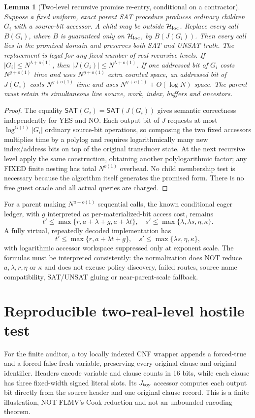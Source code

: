\documentclass[11pt]{article}
\newtheorem{lemma}[theorem]{Lemma}
\newcommand{\SAT}{\mathsf{SAT}}
\begin{document}
\begin{lemma}[Two-level recursive promise re-entry, conditional on a contractor]\label{lem:reentry}
Suppose a fixed uniform, exact parent SAT procedure produces ordinary children $G_i$ with a source-bit accessor. A child may be outside $\mathcal H_{\rm loc}$. Replace every call $B(G_i)$, where $B$ is guaranteed only on $\mathcal H_{\rm loc}$, by $B(J(G_i))$. Then every call lies in the promised domain and preserves both SAT and UNSAT truth. The replacement is legal for any fixed number of real recursive levels. If $|G_i|\le N^{\lambda+o(1)}$, then $|J(G_i)|\le N^{\lambda+o(1)}$. If one addressed bit of $G_i$ costs $N^{g+o(1)}$ time and uses $N^{\eta+o(1)}$ extra counted space, an addressed bit of $J(G_i)$ costs $N^{g+o(1)}$ time and uses $N^{\eta+o(1)}+O(\log N)$ space. The parent must retain its simultaneous live source, work, index, buffers and ancestors.
\end{lemma}
\begin{proof}
The equality $\SAT(G_i)=\SAT(J(G_i))$ gives semantic correctness independently for YES and NO. Each output bit of $J$ requests at most $\log^{O(1)}|G_i|$ ordinary source-bit operations, so composing the two fixed accessors multiplies time by a polylog and requires logarithmically many new index/address bits on top of the original transducer state. At the next recursive level apply the same construction, obtaining another polylogarithmic factor; any FIXED finite nesting has total $N^{o(1)}$ overhead. No child membership test is necessary because the algorithm itself generates the promised form. There is no free guest oracle and all actual queries are charged.\end{proof}

For a parent making $N^{a+o(1)}$ sequential calls, the known conditional eager ledger, with $g$ interpreted as per-materialized-bit access cost, remains
\[
 t'\le\max\{r,a+\lambda+g,a+\lambda t\},\quad
 s'\le\max\{\lambda,\lambda s,\eta,\kappa\}.
\]
A fully virtual, repeatedly decoded implementation has
\[
 t'\le\max\{r,a+\lambda t+g\},\quad
 s'\le\max\{\lambda s,\eta,\kappa\},
\]
with logarithmic accessor workspace suppressed only at exponent scale. The formulas must be interpreted consistently: the normalization does NOT reduce $a,\lambda,r,\eta$ or $\kappa$ and does not excuse policy discovery, failed routes, source name compatibility, SAT/UNSAT gluing or near-parent-scale fallback.

\section{Reproducible two-real-level hostile test}
For the finite auditor, a toy locally indexed CNF wrapper appends a forced-true and a forced-false fresh variable, preserving every original clause and original identifier. Headers encode variable and clause counts in 16 bits, while each clause has three fixed-width signed literal slots. Its $J_{\rm toy}$ accessor computes each output bit directly from the source header and one original clause record. This is a finite illustration, NOT FLMV's Cook reduction and not an unbounded encoding theorem.
\end{document}
